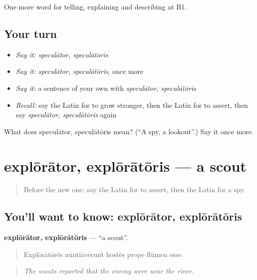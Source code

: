 \begin{grammarlens}[title={What you've built}]
One more word for telling, explaining and describing at B1.
\end{grammarlens}

\subsection*{Your turn}
\begin{itemize}
\raggedright
  \item \emph{Say it:} \emph{speculātor, speculātōris}
  \item \emph{Say it:} \emph{speculātor, speculātōris}, once more
  \item \emph{Say it:} a sentence of your own with \emph{speculātor, speculātōris}
  \item \emph{Recall:} say the Latin for to grow stronger, then the Latin for to assert, then say \emph{speculātor, speculātōris} again
\end{itemize}

\begin{tcolorbox}[breakable,colback=teal!4,colframe=teal!35!black,title={Before you move on}]
What does speculātor, speculātōris mean? (\textquotedblleft{}A spy, a lookout\textquotedblright{}.) Say it once more.
\end{tcolorbox}
\section[explōrātor, explōrātōris]{explōrātor, explōrātōris — a scout}

\label{lesson:LA-C302-explorator}



\begin{quote}
Before the new one: say the Latin for to assert, then the Latin for a spy.
\end{quote}

\subsection*{You'll want to know: explōrātor, explōrātōris}
\textbf{explōrātor, explōrātōris} — \textquotedblleft{}a scout\textquotedblright{}.

\begin{quote}
Explōrātōrēs nūntiāvērunt hostēs prope flūmen esse.
\end{quote}

\begin{quote}
\emph{The scouts reported that the enemy were near the river.}
\end{quote}

